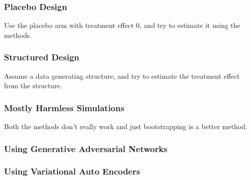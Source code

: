 \documentclass{beamer}
\begin{document}
\begin{frame}
	\frametitle{Placebo Design}
	Use the placebo arm with treatment effect 0, and try to estimate it using the methods.
\end{frame}

\begin{frame}
	\frametitle{Structured Design}
	Assume a data generating structure, and try to estimate the treatment effect from the structure.
\end{frame}

\begin{frame}
	\frametitle{Mostly Harmless Simulations}
	Both the methods don't really work and just bootstrapping is a better method.
\end{frame}

\begin{frame}
	\frametitle{Using Generative Adversarial Networks}

\end{frame}

\begin{frame}
	\frametitle{Using Variational Auto Encoders}
\end{frame}
\end{document}
